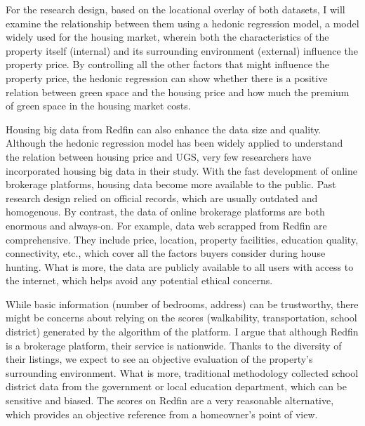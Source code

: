 For the research design, based on the locational overlay of both datasets, I will examine the relationship between them using a hedonic regression model, a model widely used for the housing market, wherein both the characteristics of the property itself (internal) and its surrounding environment (external) influence the property price. By controlling all the other factors that might influence the property price, the hedonic regression can show whether there is a positive relation between green space and the housing price and how much the premium of green space in the housing market costs. 

Housing big data from Redfin can also enhance the data size and quality. Although the hedonic regression model has been widely applied to understand the relation between housing price and UGS, very few researchers have incorporated housing big data in their study. With the fast development of online brokerage platforms, housing data become more available to the public. Past research design relied on official records, which are usually outdated and homogenous. By contrast, the data of online brokerage platforms are both enormous and always-on. For example, data web scrapped from Redfin are comprehensive. They include price, location, property facilities, education quality, connectivity, etc., which cover all the factors buyers consider during house hunting. What is more, the data are publicly available to all users with access to the internet, which helps avoid any potential ethical concerns.

While basic information (number of bedrooms, address) can be trustworthy, there might be concerns about relying on the scores (walkability, transportation, school district) generated by the algorithm of the platform. I argue that although Redfin is a brokerage platform, their service is nationwide. Thanks to the diversity of their listings, we expect to see an objective evaluation of the property’s surrounding environment. What is more, traditional methodology collected school district data from the government or local education department, which can be sensitive and biased. The scores on Redfin are a very reasonable alternative, which provides an objective reference from a homeowner’s point of view.

